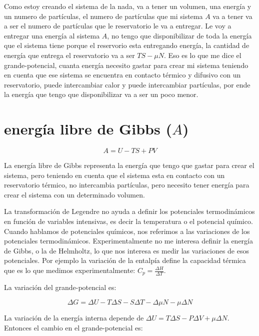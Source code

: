 \documentclass[11pt,fleqn]{book}
\begin{document}
Como estoy creando el sistema de la nada, va a tener un volumen, una energía y un numero de partículas, el numero de partículas que mi sistema $A$ va a tener va a ser el numero de partículas que le reservatorio le va a entregar. Le voy a entregar una energía al sistema $A$, no tengo que disponibilizar de toda la energía que el sistema tiene porque el reservorio esta entregando energía, la cantidad de energía que entrega el reservatorio va a ser $TS-\mu N$. Eso es lo que me dice el grande-potencial, cuanta energía necesito gastar para crear mi sistema teniendo en cuenta que ese sistema se encuentra en contacto térmico y difusivo con un reservatorio, puede intercambiar calor y puede intercambiar partículas, por ende la energía que tengo que disponibilizar va a ser un poco menor. 

\section{energía libre de Gibbs ($A$)}

\begin{equation}
A=U-TS+PV
    \label{Eq. 5.12}
\end{equation}

La energía libre de Gibbs representa la energía que tengo que gastar para crear el sistema, pero teniendo en cuenta que el sistema esta en contacto con un reservatorio térmico, no intercambia partículas, pero necesito tener energía para crear el sistema con un determinado volumen. 

La transformación de Legendre no ayuda a definir los potenciales termodinámicos en función de variables intensivas, es decir la temperatura o el potencial químico. Cuando hablamos de potenciales químicos, nos referimos a las variaciones de los potenciales termodinámicos. Experimentalmente no me interesa definir la energía de Gibbs, o la de Helmholtz, lo que nos interesa es medir las variaciones de esos potenciales. Por ejemplo la variación de la entalpía define la capacidad térmica que es lo que medimos experimentalmente: $C_{p}=\frac{\Delta H}{\Delta T}$. 

La variación del grande-potencial es:

\begin{equation*}
    \Delta G=\Delta U-T\Delta S-S\Delta T-\Delta\mu N-\mu\Delta  N    
\end{equation*}

La variación de la energía interna depende de $\Delta U=T\Delta S-P\Delta V+\mu\Delta N$. Entonces el cambio en el grande-potencial es:
\end{document}

